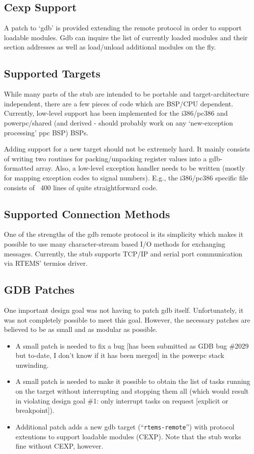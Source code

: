 \documentclass{article}
\newcommand{\cmd}[1]{{\tt #1}}
\begin{document}
\subsection{Cexp Support}
A patch to `gdb' is provided extending the remote protocol
in order to support loadable modules. Gdb can inquire the
list of currently loaded modules and their section addresses
as well as load/unload additional modules on the fly.

\subsection{Supported Targets}
While many parts of the stub are intended to be portable
and target-architecture independent, there are a few pieces of code
which are BSP/CPU dependent. Currently, low-level support
has been implemented for the i386/pc386 and
powerpc/shared (and derived - should probably work on any
`new-exception processing' ppc BSP) BSPs.

Adding support for a new target should not be extremely
hard. It mainly consists of writing two routines for
packing/unpacking register values into a gdb-formatted
array. Also, a low-level exception handler needs to be
written (mostly for mapping exception codes to signal numbers).
E.g., the i386/pc386 specific file consists of ~400 lines
of quite straightforward code.

\subsection{Supported Connection Methods}
One of the strengths of the gdb remote protocol is its simplicity
which makes it possible to use many character-stream based
I/O methods for exchanging messages.
Currently, the stub supports TCP/IP and serial port communication
via RTEMS' termios driver.

\subsection{GDB Patches}
One important design goal was not having to patch gdb itself.
Unfortunately, it was not completely possible to meet this
goal. However, the necessary patches are believed to be
as small and as modular as possible.

\begin{itemize}
\item
 A small patch is needed to fix a bug [has been submitted
 as GDB bug \#2029
 but to-date, I don't know if it has been merged] in the
 powerpc stack unwinding.
\item
 A small patch is needed to make it possible to obtain
 the list of tasks running on the target without interrupting
 and stopping them all
 (which would result in violating design goal \#1: only
 interrupt tasks on request [explicit or breakpoint]).
\item
 Additional patch adds a new gdb target (``\cmd{rtems-remote}'')
 with protocol
 extentions to support loadable modules (CEXP). Note that
 the stub works fine without CEXP, however.
\end{itemize}
\end{document}
